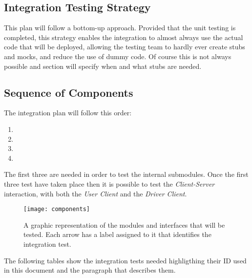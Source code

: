 \subsection{Integration Testing Strategy} %
\label{sub:integration_testing_strategy}
This plan will follow a bottom-up approach. Provided that the unit testing is completed, this strategy enables the integration to almost always use the actual code that will be deployed, allowing the testing team to hardly ever create stubs and mocks, and reduce the use of dummy code.
Of course this is not always possible and section \emph{} will specify when and what stubs are needed.

\subsection{Sequence of Components} %
\label{sub:sequence_of_components}
The integration plan will follow this order:
\begin{enumerate}
	\item {}
	\item {}
	\item {}
	\item {}
\end{enumerate}

The first three are needed in order to test the internal submodules. Once the first three test have taken place then it is possible to test the \emph{Client-Server} interaction, with both the \emph{User Client} and the \emph{Driver Client}.



\begin{figure*}[h!t]
    \centering
    \caption{A graphic representation of the modules and interfaces that will be tested. Each arrow has a label assigned to it that identifies the integration test.}
	\texttt{[image: components]}
\end{figure*}
\vfill
\clearpage

The following tables show the integration tests needed highligthing their ID used in this document and the paragraph that describes them.

